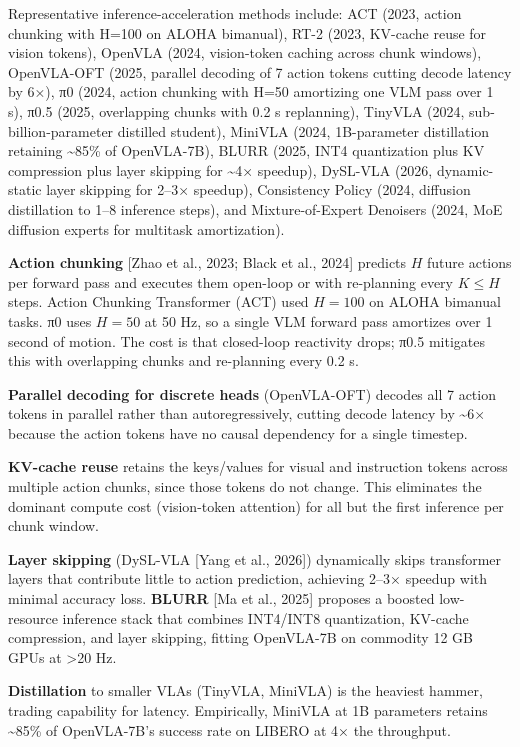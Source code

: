 Representative inference-acceleration methods include: ACT (2023, action chunking with H=100 on ALOHA bimanual), RT-2 (2023, KV-cache reuse for vision tokens), OpenVLA (2024, vision-token caching across chunk windows), OpenVLA-OFT (2025, parallel decoding of 7 action tokens cutting decode latency by 6×), π0 (2024, action chunking with H=50 amortizing one VLM pass over 1 s), π0.5 (2025, overlapping chunks with 0.2 s replanning), TinyVLA (2024, sub-billion-parameter distilled student), MiniVLA (2024, 1B-parameter distillation retaining \textasciitilde85\% of OpenVLA-7B), BLURR (2025, INT4 quantization plus KV compression plus layer skipping for \textasciitilde4× speedup), DySL-VLA (2026, dynamic-static layer skipping for 2--3× speedup), Consistency Policy (2024, diffusion distillation to 1--8 inference steps), and Mixture-of-Expert Denoisers (2024, MoE diffusion experts for multitask amortization).

\textbf{Action chunking} {[}Zhao et al., 2023; Black et al., 2024{]} predicts \(H\) future actions per forward pass and executes them open-loop or with re-planning every \(K \le H\) steps. Action Chunking Transformer (ACT) used \(H=100\) on ALOHA bimanual tasks. π0 uses \(H = 50\) at 50 Hz, so a single VLM forward pass amortizes over 1 second of motion. The cost is that closed-loop reactivity drops; π0.5 mitigates this with overlapping chunks and re-planning every 0.2 s.

\textbf{Parallel decoding for discrete heads} (OpenVLA-OFT) decodes all 7 action tokens in parallel rather than autoregressively, cutting decode latency by \textasciitilde6× because the action tokens have no causal dependency for a single timestep.

\textbf{KV-cache reuse} retains the keys/values for visual and instruction tokens across multiple action chunks, since those tokens do not change. This eliminates the dominant compute cost (vision-token attention) for all but the first inference per chunk window.

\textbf{Layer skipping} (DySL-VLA {[}Yang et al., 2026{]}) dynamically skips transformer layers that contribute little to action prediction, achieving 2--3× speedup with minimal accuracy loss. \textbf{BLURR} {[}Ma et al., 2025{]} proposes a boosted low-resource inference stack that combines INT4/INT8 quantization, KV-cache compression, and layer skipping, fitting OpenVLA-7B on commodity 12 GB GPUs at \textgreater20 Hz.

\textbf{Distillation} to smaller VLAs (TinyVLA, MiniVLA) is the heaviest hammer, trading capability for latency. Empirically, MiniVLA at 1B parameters retains \textasciitilde85\% of OpenVLA-7B's success rate on LIBERO at 4× the throughput.

